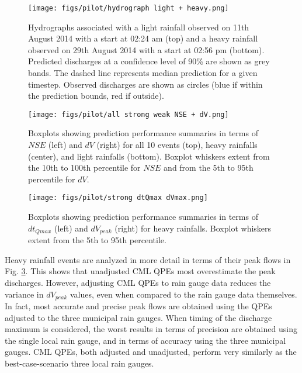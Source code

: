 \documentclass{ctuthesis}\usepackage[]{graphicx}\usepackage[]{color}
\begin{document}
\begin{figure}[H]
\begin{center}
\texttt{[image: figs/pilot/hydrograph light + heavy.png]}
\caption{Hydrographs associated with a light rainfall observed on 11th August 2014 with a start at 02:24 am (top) and a heavy rainfall observed on 29th August 2014 with a start at 02:56 pm (bottom). Predicted discharges at a confidence level of 90\% are shown as grey bands. The dashed line represents median prediction for a given timestep. Observed discharges are shown as circles (blue if within the prediction bounds, red if outside).} \label{pil_fig1}
\end{center}
\end{figure}



\begin{figure}[H]
\begin{center}
\texttt{[image: figs/pilot/all strong weak NSE + dV.png]}
\caption{Boxplots showing prediction performance summaries in terms of $N\!S\!E$ (left) and $dV$ (right) for all 10 events (top), heavy rainfalls (center), and light rainfalls (bottom). Boxplot whiskers extent from the 10th to 100th percentile for $N\!S\!E$ and from the 5th to 95th percentile for $dV$.} \label{pil_fig2}
\end{center}
\end{figure}



\begin{figure}[H]
\begin{center}
\texttt{[image: figs/pilot/strong dtQmax dVmax.png]}
\caption{Boxplots showing prediction performance summaries in terms of $dt_{Qmax}$ (left) and $dV_{peak}$ (right) for heavy rainfalls. Boxplot whiskers extent from the 5th to 95th percentile.} \label{pil_fig3}
\end{center}
\end{figure}

Heavy rainfall events are analyzed in more detail in terms of their peak flows in Fig. \ref{pil_fig3}. This shows that unadjusted CML QPEs most overestimate the peak discharges. However, adjusting CML QPEs to rain gauge data reduces the variance in $dV_{peak}$ values, even when compared to the rain gauge data themselves. In fact, most accurate and precise peak flows are obtained using the QPEs adjusted to the three municipal rain gauges. When timing of the discharge maximum is considered, the worst results in terms of precision are obtained using the single local rain gauge, and in terms of accuracy using the three municipal gauges. CML QPEs, both adjusted and unadjusted, perform very similarly as the best-case-scenario three local rain gauges.
\end{document}
